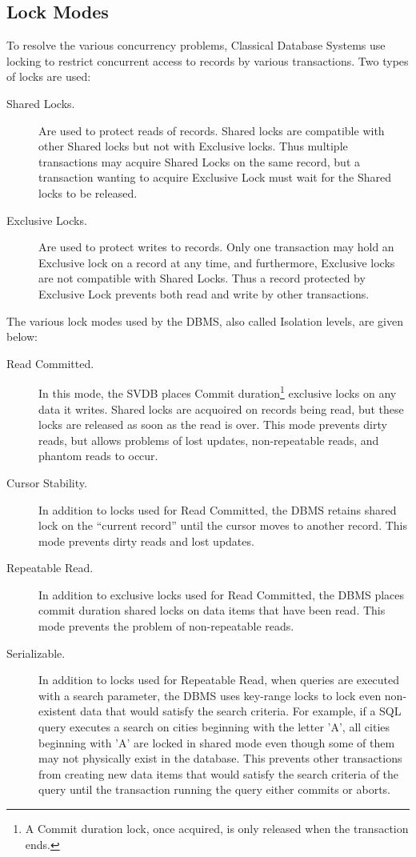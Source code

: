 \documentclass{article}
\begin{document}
\subsection{Lock Modes}
To resolve the various concurrency problems, Classical Database
Systems use locking to restrict concurrent access to records by
various transactions. Two types of locks are used:

\begin{description}
\item[Shared Locks.] Are used to protect reads of records. Shared locks
are compatible with other Shared locks but not with Exclusive locks.
Thus multiple transactions may acquire Shared Locks on the same
record, but a transaction wanting to acquire Exclusive Lock must
wait for the Shared locks to be released.
\item[Exclusive Locks.] Are used to protect writes to records. Only
one transaction may hold an Exclusive lock on a record at any time,
and furthermore, Exclusive locks are not compatible with Shared
Locks. Thus a record protected by Exclusive Lock prevents both read
and write by other transactions.
\end{description}

 The various lock
modes used by the DBMS, also called Isolation levels, are given
below:

\begin{description}
\item[Read Committed.] In this mode, the SVDB places Commit duration\footnote{A
Commit duration lock, once acquired, is only released when the
transaction ends.} exclusive locks on any data it writes. Shared locks 
are acquoired on records being read, but these locks are released 
as soon as the read is over. This mode prevents dirty reads, but allows
problems of lost updates, non-repeatable reads, and phantom reads
to occur.
\item[Cursor Stability.] In addition to locks used for Read Committed,
the DBMS retains shared lock on the ``current record'' until 
the cursor moves to another record. This mode prevents dirty reads and lost 
updates.
\item[Repeatable Read.] In addition to exclusive locks used for Read Committed, 
the DBMS places commit duration shared locks on
data items that have been read. This mode prevents the problem of
non-repeatable reads.
\item[Serializable.] In addition to locks used for Repeatable Read, 
when queries are executed with a search
parameter, the DBMS uses key-range locks to lock even non-existent
data that would satisfy the search criteria. For example, if a SQL
query executes a search on cities beginning with the letter 'A', all
cities beginning with 'A' are locked in shared mode even though some
of them may not physically exist in the database. This prevents
other transactions from creating new data items that would satisfy
the search criteria of the query until the transaction running the
query either commits or aborts.
\end{description}
\end{document}
